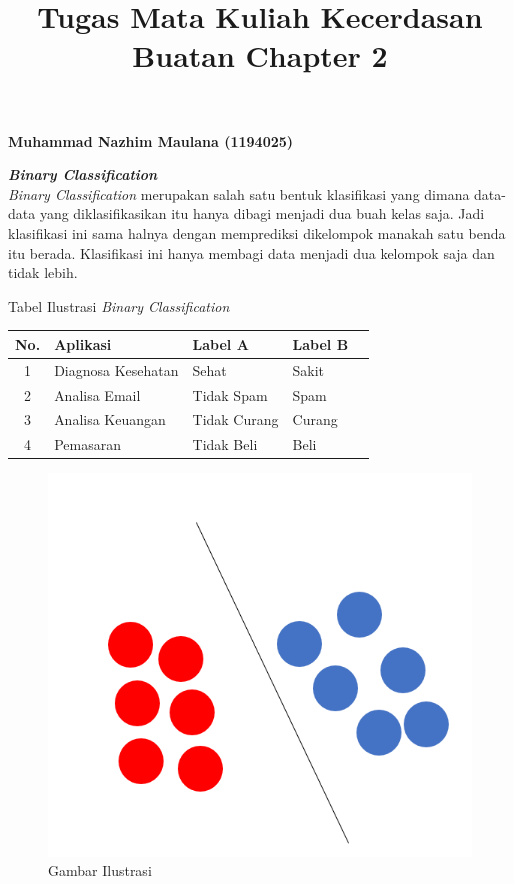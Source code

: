 \documentclass{report}
\begin{document}
\title{Tugas Mata Kuliah Kecerdasan Buatan Chapter 2}
\maketitle

{\bf Muhammad Nazhim Maulana (1194025)}
\vspace{0.4cm}

{\bf \emph{Binary Classification}}
\vspace{0.1cm}
\\\hangindent=0.5cm \emph{Binary Classification} merupakan salah satu bentuk klasifikasi yang dimana data-data yang diklasifikasikan itu hanya dibagi menjadi dua buah kelas saja. Jadi klasifikasi ini sama halnya dengan memprediksi dikelompok manakah satu benda itu berada. Klasifikasi ini hanya membagi data menjadi dua kelompok saja dan tidak lebih.

\vspace{0.4cm}
\begin{center}
Tabel Ilustrasi \emph{Binary Classification} 
\begin{table}[h!]
\centering
\begin{tabular}{|c|l|l|l|l|} %
\hline %
No. & Aplikasi &  Label A& Label B \\
\hline %
1   & Diagnosa Kesehatan & Sehat & Sakit\\
2   & Analisa Email & Tidak Spam & Spam\\
3   & Analisa Keuangan & Tidak Curang & Curang\\
4   & Pemasaran&	Tidak Beli& Beli\\
\hline %
\end{tabular}
\end{table}
\end{center}

\begin{figure}[hbtp]
\caption{Gambar Ilustrasi}
\centering
\includegraphics[scale=0.6]{../figures/Ilustrasi.png}
\end{figure}
\end{document}
